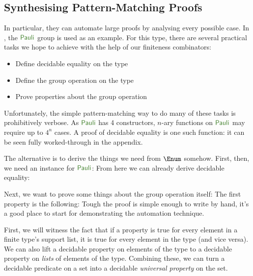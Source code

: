 \begin{refsection}
\subsection{Synthesising Pattern-Matching Proofs}
In particular, they can automate large proofs by analysing every possible case.
In \cite{firsovDependentlyTypedProgramming2015}, the \(\AgdaDatatype{Pauli}\)
group is used as an example.
For this type, there are several practical tasks we hope to achieve with the
help of our finiteness combinators:
\begin{itemize}
  \item Define decidable equality on the type
  \item Define the group operation on the type
  \item Prove properties about the group operation
\end{itemize}
Unfortunately, the simple pattern-matching way to do many of these tasks is
prohibitively verbose.
As \(\AgdaDatatype{Pauli}\) has 4 constructors, \(n\)-ary functions on
\(\AgdaDatatype{Pauli}\) may require up to \(4^n\) cases.
A proof of decidable equality is one such function: it can be seen fully
worked-through in the appendix.

The alternative is to derive the things we need from \(\Enum\) somehow.
First, then, we need an instance for \(\AgdaDatatype{Pauli}\):
From here we can already derive decidable equality:

Next, we want to prove some things about the group operation itself:
The first property is the following:
Tough the proof is simple enough to write by hand, it's a good place to start
for demonstrating the automation technique.

First, we will witness the fact that if a property is true for every element in
a finite type's support list, it is true for every element in the type (and vice
versa).
We can also lift a decidable property on elements of the type to a decidable
property on \emph{lists} of elements of the type.
Combining these, we can turn a decidable predicate on a set into a decidable
\emph{universal property} on the set.


\end{refsection}
